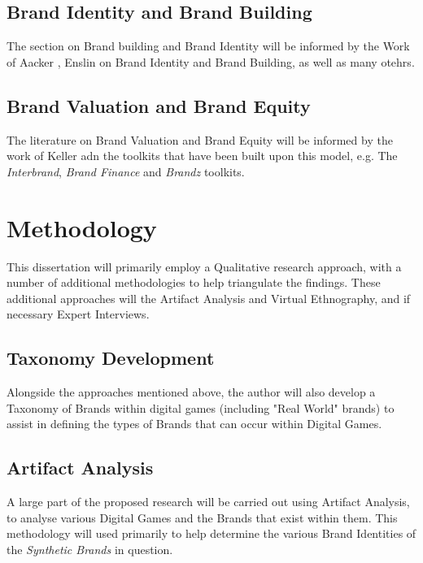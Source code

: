 \documentclass[10pt,twoside]{article}
\begin{document}
\subsection{Brand Identity and Brand Building}

The section on Brand building and Brand Identity will be informed by the Work of Aacker \cite{aaker2012brand}, Enslin \cite{cook2010healthy} on Brand Identity and Brand Building, as well as many otehrs.

\subsection{Brand Valuation and Brand Equity}

The literature on Brand Valuation and Brand Equity will be informed by the work of Keller \cite{keller1998effects} adn the toolkits that have been built upon this model, e.g. The \emph{Interbrand}, \emph{Brand Finance} and \emph{Brandz} toolkits. 

\section{Methodology}

This dissertation will primarily employ a Qualitative research approach, with a number of additional methodologies to help triangulate the findings. These additional approaches will the Artifact Analysis and Virtual Ethnography, and if necessary Expert Interviews.

\subsection{Taxonomy Development}

Alongside the approaches mentioned above, the author will also develop a Taxonomy of Brands within digital games (including "Real World" brands) to assist in defining the types of Brands that can occur within Digital Games.

\subsection{Artifact Analysis}

A large part of the proposed research will be carried out using Artifact Analysis, to analyse various Digital Games and the Brands that exist within them. This methodology will used primarily to help determine the various Brand Identities of the \emph{Synthetic Brands} in question.
\end{document}

